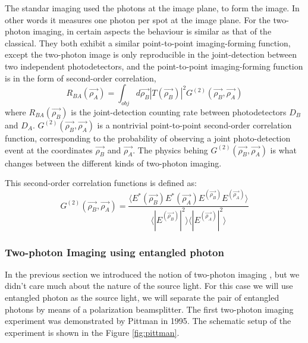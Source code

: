 The standar imaging used the photons at the image plane, to form the image. In other 
words it measures one photon per spot at the image plane. For the two-photon imaging, in certain 
aspects the behaviour is similar as that of the classical.
They both exhibit a similar point-to-point imaging-forming function, except the 
two-photon image is only reproducible in the joint-detection between two independent photodetectors,
and the point-to-point imaging-forming function is in the form of second-order correlation,
\begin{equation}\label{eq:coincidences}
R_{BA}(\vec{\rho_A})=\int_{obj} d\vec{\rho_B} |T(\vec{\rho_B})|^2 G^{(2)}(\vec{\rho_B},\vec{\rho_A})
\end{equation}
where $R_{BA}(\vec{\rho_B})$ is the joint-detection counting rate between photodetectors $D_B$ and $D_A$.
$G^{(2)}(\vec{\rho_B},\vec{\rho_A})$ is a nontrivial point-to-point second-order correlation
function, corresponding to the probability of observing a joint photo-detection event
at the coordinates $\vec{\rho_B}$ and $\vec{\rho_A}$. The physics behing $G^{(2)}(\vec{\rho_B},\vec{\rho_A})$
is what changes between the different kinds of two-photon imaging.

This second-order correlation functions is defined as\cite{introquantumoptics}:
\begin{equation}
G^{(2)} (\vec{\rho_B},\vec{\rho_A})= \frac{ \langle E^* (\vec{\rho_B}) E^* (\vec{\rho_A}) E^ (\vec{\rho_B}) E^ (\vec{\rho_A}) \rangle }{\langle |E^ (\vec{\rho_B})|^2 \rangle \langle |E^ (\vec{\rho_A})|^2 \rangle}
\end{equation}

\subsubsection{Two-photon Imaging using entangled photon}

In the previous section we introduced the notion of two-photon imaging , but we didn't care 
much about the nature of the source light. For this case we will use entangled photon as the 
source light, we will separate the pair of entangled photons by means of a polarization 
beamsplitter. The first two-photon imaging experiment was demonstrated by Pittman in 
1995\cite{pittman}. The schematic setup of the experiment is shown in the 
Figure \ref{fig:pittman}. \\ 


